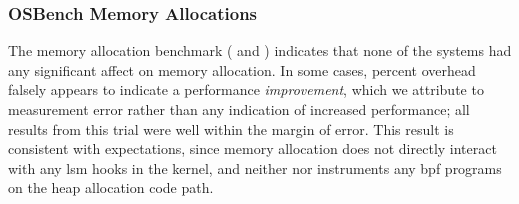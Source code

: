 \subsubsection{OSBench Memory Allocations}

The memory allocation benchmark ( and
) indicates that none of the systems had any significant affect on
memory allocation. In some cases, percent overhead falsely appears to indicate
a performance \textit{improvement}, which we attribute to measurement error rather than
any indication of increased performance; all results from this trial were well within the
margin of error. This result is consistent with expectations, since memory allocation does
not directly interact with any \gls{lsm} hooks in the kernel, and neither \bpfbox{} nor
\bpfcontain{} instruments any \gls{bpf} programs on the heap allocation code path.





